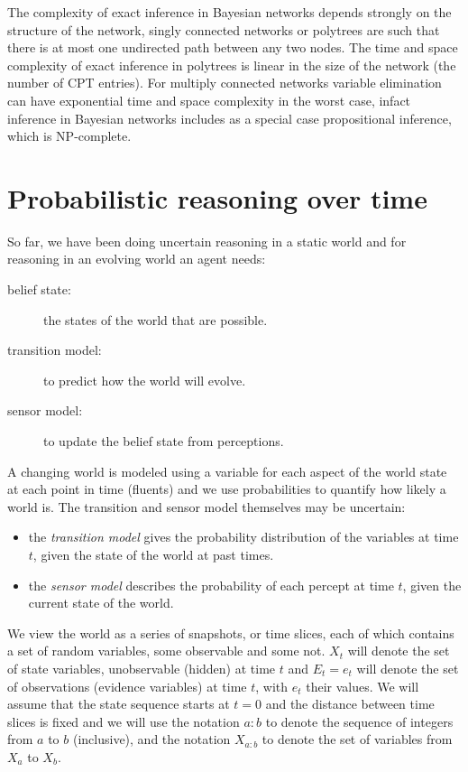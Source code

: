 The complexity of exact inference in Bayesian networks depends strongly on the structure
of the network, singly connected networks or polytrees are such that there
is at most one undirected path between any two nodes.\newline
The time and space complexity of exact inference in polytrees is linear in the size
of the network (the number of CPT entries).\newline
For multiply connected networks variable elimination can have exponential time and 
space complexity in the worst case, infact inference in Bayesian networks 
includes as a special case propositional inference, which is NP-complete.

\section{Probabilistic reasoning over time}
So far, we have been doing uncertain reasoning in a static world and for reasoning in an
evolving world an agent needs:
\begin{description}
   \item [belief state: ] the states of the world that are possible.
   \item [transition model: ] to predict how the world will evolve.
   \item [sensor model: ] to update the belief state from perceptions.
\end{description}
A changing world is modeled using a variable for each aspect of the world state at each point
in time (fluents) and we use probabilities to quantify how likely a world is.\newline
The transition and sensor model themselves may be uncertain:
\begin{itemize}
   \item the \emph{transition model} gives the probability distribution of the variables
	 at time $t$, given the state of the world at past times.
   \item the \emph{sensor model} describes the probability of each percept at time $t$,
	 given the current state of the world.
\end{itemize}
We view the world as a series of snapshots, or time slices, each of which contains a set of
random variables, some observable and some not.\newline
$X_t$ will denote the set of state variables, unobservable (hidden) at time $t$ and 
$E_t = e_t$ will denote the set of observations (evidence variables) at time $t$, with 
$e_t$ their values.\newline
We will assume that the state sequence starts at $t=0$ and the distance between time slices 
is fixed and we will use the notation $a:b$ to denote the sequence of integers 
from $a$ to $b$ (inclusive), and the notation $X_{a:b}$ to denote the set of variables
from $X_a$ to $X_b$.

